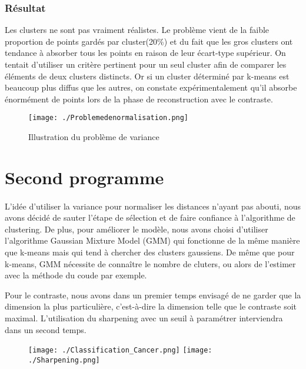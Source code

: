 \documentclass[a4paper,10pt]{article}
\begin{document}
\subsubsection*{Résultat}

Les clusters ne sont pas vraiment réalistes. Le problème vient de la faible proportion de points gardés par cluster(20\%) et du fait que les gros clusters ont tendance à absorber tous les points en raison de leur écart-type supérieur.
On tentait d’utiliser un critère pertinent pour un seul cluster afin de comparer les éléments de deux clusters distincts. Or si un cluster déterminé par k-means est beaucoup plus diffus que les autres, on constate expérimentalement qu’il absorbe énormément de points lors de la phase de reconstruction avec le contraste.

\begin{figure}[h]
 \begin{center}
  \texttt{[image: ./Problemedenormalisation.png]}
 \end{center}
 \caption{Illustration du problème de variance}
\end{figure}


\section{Second programme}


\paragraph{}

L'idée d'utiliser la variance pour normaliser les distances n'ayant pas abouti, nous avons décidé de sauter l'étape de sélection et de faire confiance à l'algorithme de clustering. De plus, pour améliorer le modèle, nous avons choisi d'utiliser l'algorithme Gaussian Mixture Model (GMM) qui fonctionne de la même manière que k-means mais qui tend à chercher des clusters gaussiens. De même que pour k-means, GMM nécessite de connaître le nombre de cluters, ou alors de l'estimer avec la méthode du coude par exemple.

Pour le contraste, nous avons dans un premier temps envisagé de ne garder que la dimension la plus particulière, c'est-à-dire la dimension telle que le contraste soit maximal. L'utilisation du sharpening avec un seuil à paramétrer interviendra dans un second temps. 

\begin{figure}[h]
	\texttt{[image: ./Classification\_Cancer.png]}
    \texttt{[image: ./Sharpening.png]}
\end{figure}
\end{document}
